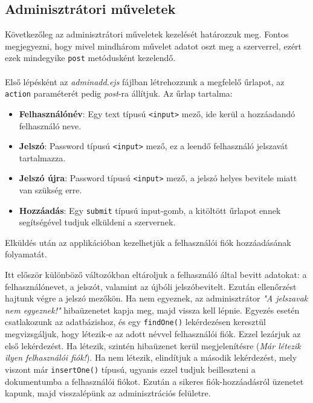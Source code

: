 \subsection{Adminisztrátori műveletek}

Következőleg az adminisztrátori műveletek kezelését határozzuk meg. Fontos megjegyezni, hogy mivel mindhárom művelet adatot oszt meg a szerverrel, ezért ezek mindegyike \texttt{post} metódusként kezelendő.\\

\\

Első lépésként az \textit{adminadd.ejs} fájlban létrehozzunk a megfelelő űrlapot, az \texttt{action} paraméterét pedig \textit{post}-ra állítjuk. Az űrlap tartalma:

\begin{itemize}
\item{\textbf{Felhasználónév}: Egy text típusú \texttt{<input>} mező, ide kerül a hozzáadandó felhasználó neve.}
\item{\textbf{Jelszó}: Password típusú \texttt{<input>} mező, ez a leendő felhasználó jelszavát tartalmazza.}
\item{\textbf{Jelszó újra}: Password típusú \texttt{<input>} mező, a jelszó helyes bevitele miatt van szükség erre.}
\item{\textbf{Hozzáadás}: Egy \texttt{submit} típusú input-gomb, a kitöltött űrlapot ennek segítségével tudjuk elküldeni a szervernek.}
\end{itemize}

Elküldés után az applikációban kezelhetjük a felhasználói fiók hozzáadásának folyamatát.

Itt először különböző változókban eltároljuk a felhasználó által bevitt adatokat: a felhasználónevet, a jelszót, valamint az újbóli jelszóbevitelt. Ezután ellenőrzést hajtunk végre a jelszó mezőkön. Ha nem egyeznek, az adminisztrátor \textit{"A jelszavak nem egyeznek!"} hibaüzenetet kapja meg, majd vissza kell lépnie. Egyezés esetén csatlakozunk az adatbázishoz, és egy \texttt{findOne()} lekérdezésen keresztül megvizsgáljuk, hogy létezik-e az adott névvel felhasználói fiók. Ezzel lezárjuk az első lekérdezést. Ha létezik, szintén hibaüzenet kerül megjelenítésre (\textit{Már létezik ilyen felhasználói fiók!}). Ha nem létezik, elindítjuk a második lekérdezést, mely viszont már \texttt{insertOne()} típusú, ugyanis ezzel tudjuk beilleszteni a dokumentumba a felhasználói fiókot. Ezután a sikeres fiók-hozzáadásról üzenetet kapunk, majd visszalépünk az adminisztrációs felületre.\\

